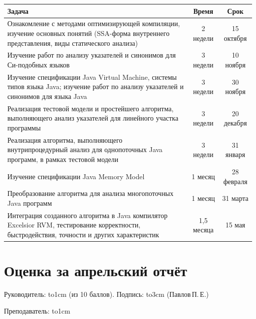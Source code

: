 \documentclass[14pt,titlepage]{extarticle}
\newcommand{\underscore}[1]{\hbox to#1{\hrulefill}}
\begin{document}
    \begin{center}
      \begin{tabular}{|p{10.5cm}|c|c|}\hline
        \textbf{Задача}                       &\textbf{Время} & \textbf{Срок}\\
        \hline
        Ознакомление с методами оптимизирующей компиляции, изучение
        основных понятий (SSA-форма внутреннего представления,
        виды статического анализа)
                                              & 2 недели    & 15 октября \\
        \hline
        Изучение работ по анализу указателей и синонимов для Си-подобных языков
                                              & 3 недели    & 10 ноября \\
        \hline
        Изучение спецификации Java Virtual Machine, системы типов языка Java;
        изучение работ по анализу указателей и синонимов для языка Java
                                              & 3 недели    & 30 ноября \\
        \hline
        Реализация тестовой модели и простейшего алгоритма, выполняющего
        анализ указателей для линейного участка программы
                                              & 3 недели    & 20 декабря \\
        \hline
        Реализация алгоритма, выполняющего внутрипроцедурный анализ для
        однопоточных Java программ, в рамках тестовой модели
                                              & 3 недели    & 31 января \\
        \hline
        Изучение спецификации Java Memory Model
                                              & 1 месяц     & 28 февраля \\
        \hline
        Преобразование алгоритма для анализа многопоточных Java программ
                                              & 1 месяц     & 31 марта \\
        \hline
        Интеграция созданного алгоритма в Java компилятор Excelsior RVM,
        тестирование корректности, быстродействия, точности и
        других характеристик
                                              & 1,5 месяца  & 15 мая \\
        \hline
      \end{tabular}
    \end{center}



  \newpage
  \thispagestyle{empty}
  \pagestyle{empty}
  \section*{Оценка за апрельский отчёт}

    Руководитель: \underscore{1cm} (из 10 баллов).
    Подпись: \underscore{3cm} (Павлов\,П.\,Е.)

    \vspace{0.5cm}
    Преподаватель: \underscore{1cm}
\end{document}
